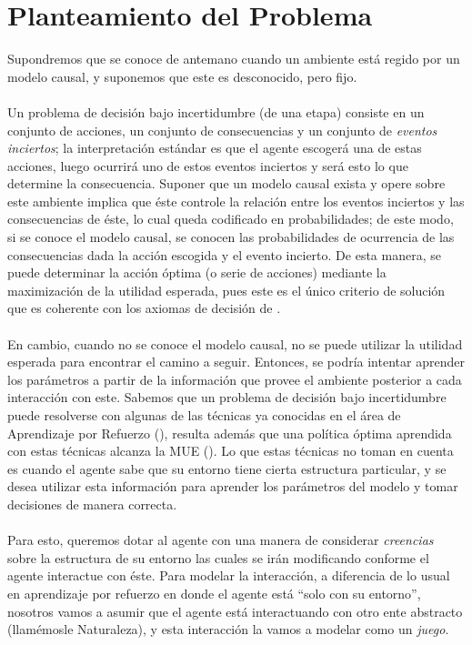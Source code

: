 \documentclass[11pt]{article}
\theoremstyle{plain}
\begin{document}
\section{Planteamiento del Problema}
Supondremos que se conoce de antemano cuando un ambiente está regido por un modelo causal, y suponemos que este es desconocido, pero fijo.\\
\\
Un problema de decisión bajo incertidumbre (de una etapa) consiste en un conjunto de acciones, un conjunto de consecuencias y un conjunto de \textit{eventos inciertos}; la interpretación estándar es que el agente escogerá una de estas acciones, luego ocurrirá uno de estos eventos inciertos y será esto lo que determine la consecuencia. Suponer que un modelo causal exista y opere sobre este ambiente implica que éste controle la relación entre los eventos inciertos y las consecuencias de éste, lo cual queda codificado en probabilidades; de este modo, si se conoce el modelo causal, se conocen las probabilidades de ocurrencia de las consecuencias dada la acción escogida y el evento incierto. De esta manera, se puede determinar la acción óptima (o serie de acciones) mediante la maximización de la utilidad esperada, pues este es el único criterio de solución que es coherente con los axiomas de decisión de \cite{savage1954the}.\\
\\
En cambio, cuando no se conoce el modelo causal, no se puede utilizar la utilidad esperada para encontrar el camino a seguir. Entonces, se podría intentar aprender los parámetros a partir de la información que provee el ambiente posterior a cada interacción con este. Sabemos que un problema de decisión bajo incertidumbre puede resolverse con algunas de las técnicas ya conocidas en el área de Aprendizaje por Refuerzo (\cite{sutton1998reinforcement}), resulta además que una política óptima aprendida con estas técnicas alcanza la MUE (\cite{webb2007game}). Lo que estas técnicas no toman en cuenta es cuando el agente sabe que su entorno tiene cierta estructura particular, y se desea utilizar esta información para aprender los parámetros del modelo y tomar decisiones de manera correcta.\\
\\
Para esto, queremos dotar al agente con una manera de considerar \textit{creencias} sobre la estructura de su entorno las cuales se irán modificando conforme el agente interactue con éste. Para modelar la interacción, a diferencia de lo usual en aprendizaje por refuerzo en donde el agente está “solo con su entorno”, nosotros vamos a asumir que el agente está interactuando con otro ente abstracto (llamémosle Naturaleza), y esta interacción la vamos a modelar como un \textit{juego}.\\
\end{document}

